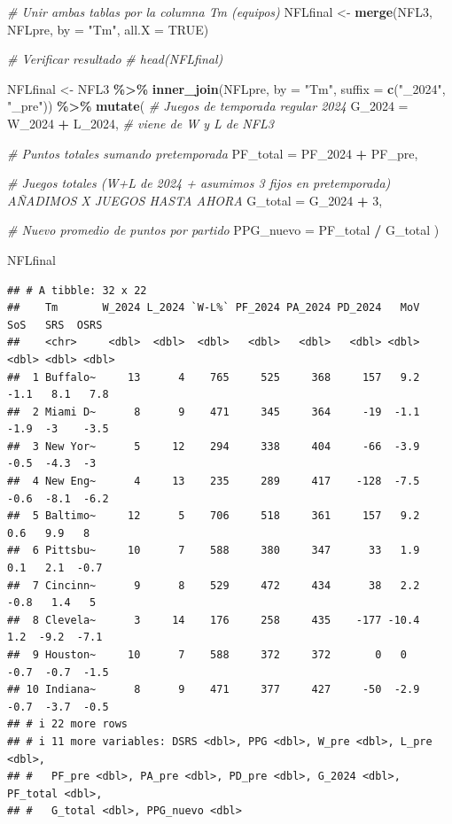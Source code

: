 \documentclass[
]{article}
\newenvironment{Shaded}{\begin{snugshade}}{\end{snugshade}}
\newcommand{\AttributeTok}[1]{\textcolor[rgb]{0.13,0.29,0.53}{#1}}
\newcommand{\CommentTok}[1]{\textcolor[rgb]{0.56,0.35,0.01}{\textit{#1}}}
\newcommand{\ConstantTok}[1]{\textcolor[rgb]{0.56,0.35,0.01}{#1}}
\newcommand{\DecValTok}[1]{\textcolor[rgb]{0.00,0.00,0.81}{#1}}
\newcommand{\FunctionTok}[1]{\textcolor[rgb]{0.13,0.29,0.53}{\textbf{#1}}}
\newcommand{\NormalTok}[1]{#1}
\newcommand{\OtherTok}[1]{\textcolor[rgb]{0.56,0.35,0.01}{#1}}
\newcommand{\SpecialCharTok}[1]{\textcolor[rgb]{0.81,0.36,0.00}{\textbf{#1}}}
\newcommand{\StringTok}[1]{\textcolor[rgb]{0.31,0.60,0.02}{#1}}
\begin{document}
\begin{Shaded}
\begin{Highlighting}[]
\CommentTok{\# Unir ambas tablas por la columna Tm (equipos)}
\NormalTok{NFLfinal }\OtherTok{\textless{}{-}} \FunctionTok{merge}\NormalTok{(NFL3, NFLpre, }\AttributeTok{by =} \StringTok{"Tm"}\NormalTok{, }\AttributeTok{all.X =} \ConstantTok{TRUE}\NormalTok{)}

\CommentTok{\# Verificar resultado}
\CommentTok{\# head(NFLfinal)}

\NormalTok{NFLfinal }\OtherTok{\textless{}{-}}\NormalTok{ NFL3 }\SpecialCharTok{\%\textgreater{}\%}
  \FunctionTok{inner\_join}\NormalTok{(NFLpre, }\AttributeTok{by =} \StringTok{"Tm"}\NormalTok{, }\AttributeTok{suffix =} \FunctionTok{c}\NormalTok{(}\StringTok{"\_2024"}\NormalTok{, }\StringTok{"\_pre"}\NormalTok{)) }\SpecialCharTok{\%\textgreater{}\%}
  \FunctionTok{mutate}\NormalTok{(}
    \CommentTok{\# Juegos de temporada regular 2024}
    \AttributeTok{G\_2024 =}\NormalTok{ W\_2024 }\SpecialCharTok{+}\NormalTok{ L\_2024,   }\CommentTok{\# viene de W y L de NFL3}
    
    \CommentTok{\# Puntos totales sumando pretemporada}
    \AttributeTok{PF\_total =}\NormalTok{ PF\_2024 }\SpecialCharTok{+}\NormalTok{ PF\_pre,}
    
    \CommentTok{\# Juegos totales (W+L de 2024 + asumimos 3 fijos en pretemporada) AÑADIMOS X JUEGOS HASTA       AHORA}
    \AttributeTok{G\_total =}\NormalTok{ G\_2024 }\SpecialCharTok{+} \DecValTok{3}\NormalTok{,  }
    
    \CommentTok{\# Nuevo promedio de puntos por partido}
    \AttributeTok{PPG\_nuevo =}\NormalTok{ PF\_total }\SpecialCharTok{/}\NormalTok{ G\_total}
\NormalTok{  )}

\NormalTok{NFLfinal}
\end{Highlighting}
\end{Shaded}

\begin{verbatim}
## # A tibble: 32 x 22
##    Tm       W_2024 L_2024 `W-L%` PF_2024 PA_2024 PD_2024   MoV   SoS   SRS  OSRS
##    <chr>     <dbl>  <dbl>  <dbl>   <dbl>   <dbl>   <dbl> <dbl> <dbl> <dbl> <dbl>
##  1 Buffalo~     13      4    765     525     368     157   9.2  -1.1   8.1   7.8
##  2 Miami D~      8      9    471     345     364     -19  -1.1  -1.9  -3    -3.5
##  3 New Yor~      5     12    294     338     404     -66  -3.9  -0.5  -4.3  -3  
##  4 New Eng~      4     13    235     289     417    -128  -7.5  -0.6  -8.1  -6.2
##  5 Baltimo~     12      5    706     518     361     157   9.2   0.6   9.9   8  
##  6 Pittsbu~     10      7    588     380     347      33   1.9   0.1   2.1  -0.7
##  7 Cincinn~      9      8    529     472     434      38   2.2  -0.8   1.4   5  
##  8 Clevela~      3     14    176     258     435    -177 -10.4   1.2  -9.2  -7.1
##  9 Houston~     10      7    588     372     372       0   0    -0.7  -0.7  -1.5
## 10 Indiana~      8      9    471     377     427     -50  -2.9  -0.7  -3.7  -0.5
## # i 22 more rows
## # i 11 more variables: DSRS <dbl>, PPG <dbl>, W_pre <dbl>, L_pre <dbl>,
## #   PF_pre <dbl>, PA_pre <dbl>, PD_pre <dbl>, G_2024 <dbl>, PF_total <dbl>,
## #   G_total <dbl>, PPG_nuevo <dbl>
\end{verbatim}
\end{document}
